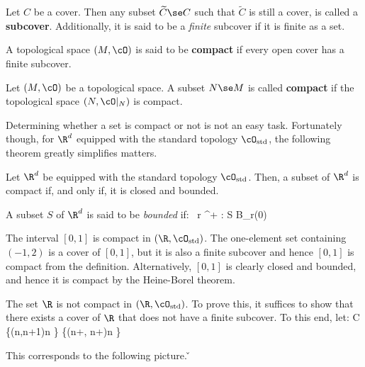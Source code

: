 \bd [Subcover]
Let $C$ be a cover. Then any subset $\widetilde{C}\se C$ such that $\widetilde{C}$ is still a cover, is called a
\textbf{subcover}. Additionally, it is said to be a \emph{finite} subcover if it is finite as a set.
\ed

A topological space $(M,\cO)$ is said to be \textbf{compact} if every open cover has a finite subcover.
\ed

Let $(M,\cO)$ be a topological space. A subset $N\se M$ is called \textbf{compact} if the topological space $(N,
\cO|_N)$ is compact.
\ed

Determining whether a set is compact or not is not an easy task. Fortunately though, for $\R^d$ equipped with the
standard topology $\cO_\mathrm{std}$, the following theorem greatly simplifies matters.

Let $\R^d$ be equipped with the standard topology $\cO_\mathrm{std}$. Then, a subset of $\R^d$ is compact if, and
only if, it is closed and bounded.
\et

A subset $S$ of $\R^d$ is said to be \emph{bounded} if:
\bse
\exists \, r \in \R^+ : S \se B_r(0)
\ese

\be
The interval $[0,1]$ is compact in $(\R,\cO_\mathrm{std})$. The one-element set containing $(-1,2)$ is a cover of
$[0,1]$, but it is also a finite subcover and hence $[0,1]$ is compact from the definition. Alternatively, $[0,1]$ is
clearly closed and bounded, and hence it is compact by the Heine-Borel theorem.
\ee

\be
The set $\R$ is not compact in $(\R,\cO_\mathrm{std})$. To prove this, it suffices to show that there exists a cover
of $\R$ that does not have a finite subcover. To this end, let:
\bse
C \coloneqq \{(n,n+1)\mid n \in \Z\} \cup \{(n+, n+)\mid n \in \Z\}
\ese

This corresponds to the following picture. \v

\begin{figure}[H]
\centering
{}
\end{figure}

